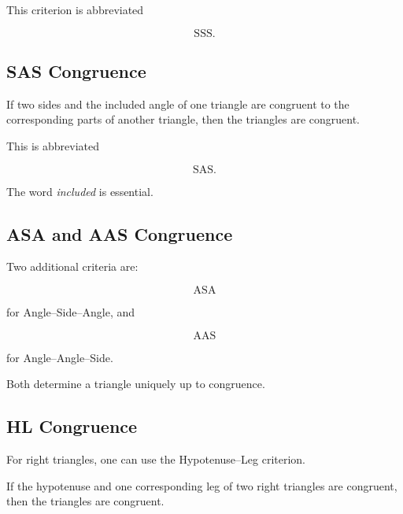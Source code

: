 This criterion is abbreviated

\[ \boxed{\mathrm{SSS}.} \]

\subsection{SAS Congruence}
\label{subsec:sas-congruence}

\begin{theorem}
If two sides and the included angle of one triangle are congruent to the
corresponding parts of another triangle, then the triangles are congruent.
\end{theorem}

This is abbreviated

\[ \boxed{\mathrm{SAS}.} \]

The word \emph{included} is essential.

\subsection{ASA and AAS Congruence}
\label{subsec:asa-aas-congruence}

Two additional criteria are:

\[
\boxed{\mathrm{ASA}}
\]

for Angle--Side--Angle, and

\[
\boxed{\mathrm{AAS}}
\]

for Angle--Angle--Side.

Both determine a triangle uniquely up to congruence.

\subsection{HL Congruence}
\label{subsec:hl-congruence}

For right triangles, one can use the Hypotenuse--Leg criterion.

\begin{theorem}
If the hypotenuse and one corresponding leg of two right triangles are
congruent, then the triangles are congruent.
\end{theorem}

